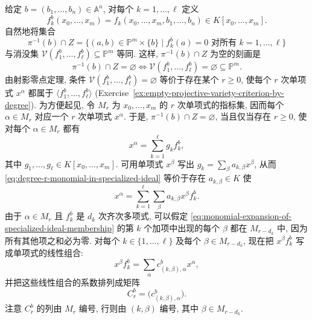 \begin{Proof}
给定 $b=(b_{1},\ldots,b_{n})\in\mathbb{A}^{n}$, 对每个 $k=1,\ldots,\ell$ 定义
\begin{equation}\label{eq:specialize-defining-polynomial-at-affine-point}
  f_{k}^{b}(x_{0},\ldots,x_{m})
  =f_{k}(x_{0},\ldots,x_{m},b_{1},\ldots,b_{n})\in K[x_{0},\ldots,x_{m}].
\end{equation}
自然地将集合
\[
  \pi^{-1}(b)\cap Z
  =\{(a,b)\in\mathbb{P}^{m}\times\{b\}\mid f_{k}^{b}(a)=0\text{ 对所有 }k=1,\ldots,\ell\}
\]
与消没集 $\mathcal{V}(f_{1}^{b},\ldots,f_{\ell}^{b})\subseteq\mathbb{P}^{m}$ 等同. 这样, $\pi^{-1}(b)\cap Z$ 为空的刻画是
\[
  \pi^{-1}(b)\cap Z=\varnothing
  \iff \mathcal{V}(f_{1}^{b},\ldots,f_{\ell}^{b})=\varnothing\subseteq\mathbb{P}^{m}.
\]
由射影零点定理, 条件 $\mathcal{V}(f_{1}^{b},\ldots,f_{\ell}^{b})=\varnothing$ 等价于存在某个 $r\ge0$, 使每个 $r$ 次单项式 $x^{\alpha}$ 都属于 $\langle f_{1}^{b},\ldots,f_{\ell}^{b}\rangle$ (Exercise~\ref{ex:empty-projective-variety-criterion-by-degree}). 为方便起见, 令 $M_{r}$ 为 $x_{0},\ldots,x_{m}$ 的 $r$ 次单项式的指标集, 因而每个 $\alpha\in M_{r}$ 对应一个 $r$ 次单项式 $x^{\alpha}$. 于是, $\pi^{-1}(b)\cap Z=\varnothing$, 当且仅当存在 $r\ge0$, 使对每个 $\alpha\in M_{r}$ 都有
\begin{equation}\label{eq:degree-r-monomial-in-specialized-ideal}
  x^{\alpha}=\sum_{k=1}^{\ell}g_{k}f_{k}^{b},
\end{equation}
其中 $g_{1},\ldots,g_{\ell}\in K[x_{0},\ldots,x_{m}]$. 可用单项式 $x^{\beta}$ 写出 $g_{k}=\sum_{\beta}a_{k,\beta}x^{\beta}$, 从而 \eqref{eq:degree-r-monomial-in-specialized-ideal} 等价于存在 $a_{k,\beta}\in K$ 使
\begin{equation}\label{eq:monomial-expansion-of-specialized-ideal-membership}
  x^{\alpha}=\sum_{k=1}^{\ell}\sum_{\beta}a_{k,\beta}x^{\beta}f_{k}^{b}.
\end{equation}
由于 $\alpha\in M_{r}$ 且 $f_{k}^{b}$ 是 $d_{k}$ 次齐次多项式, 可以假定 \eqref{eq:monomial-expansion-of-specialized-ideal-membership} 的第 $k$ 个加项中出现的每个 $\beta$ 都在 $M_{r-d_{k}}$ 中, 因为所有其他项之和必为零. 对每个 $k\in\{1,\ldots,\ell\}$ 及每个 $\beta\in M_{r-d_{k}}$, 现在把 $x^{\beta}f_{k}^{b}$ 写成单项式的线性组合:
\begin{equation}\label{eq:coefficient-matrix-row-of-specialized-monomial-multiple}
  x^{\beta}f_{k}^{b}=\sum_{\alpha}c_{(k,\beta),\alpha}^{b}x^{\alpha},
\end{equation}
并把这些线性组合的系数排列成矩阵
\[
  C_{r}^{b}=\bigl(c_{(k,\beta),\alpha}^{b}\bigr).
\]
注意 $C_{r}^{b}$ 的列由 $M_{r}$ 编号, 行则由 $(k,\beta)$ 编号, 其中 $\beta\in M_{r-d_{k}}$.


\end{Proof}
